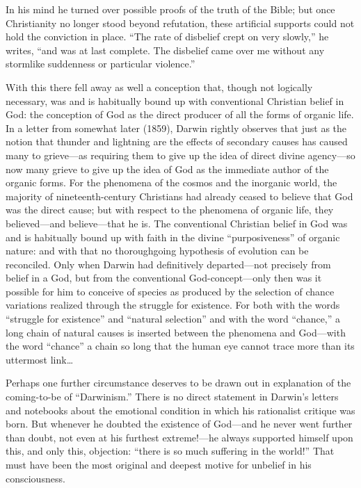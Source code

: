 \documentclass[12pt,a4paper]{article}
\begin{document}
In his mind he turned over possible proofs of the truth of the
Bible; but once Christianity no longer stood beyond refutation,
these artificial supports could not hold the conviction in
place. ``The rate of disbelief crept on very slowly,'' he
writes, ``and was at last complete. The disbelief came over me
without any stormlike suddenness or particular violence.''

With this there fell away as well a conception that, though
not logically necessary, was and is habitually bound up with
conventional Christian belief in God: the conception of God as
the direct producer of all the forms of organic life. In a
letter from somewhat later (1859), Darwin rightly observes
that just as the notion that thunder and lightning are the
effects of secondary causes has caused many to grieve---as
requiring them to give up the idea of direct divine
agency---so now many grieve to give up the idea of God as the
immediate author of the organic forms. For the phenomena of
the cosmos and the inorganic world, the majority of
nineteenth-century Christians had already ceased to believe that
God was the direct cause; but with respect to the phenomena of
organic life, they believed---and believe---that he is. The
conventional Christian belief in God was and is habitually bound
up with faith in the divine ``purposiveness'' of organic nature:
and with that no thoroughgoing hypothesis of evolution can be
reconciled. Only when Darwin had definitively departed---not
precisely from belief in a God, but from the conventional
God-concept---only then was it possible for him to conceive of
species as produced by the selection of chance variations
realized through the struggle for existence. For both with the
words ``struggle for existence'' and ``natural selection'' and
with the word ``chance,'' a long chain of natural causes is
inserted between the phenomena and God---with the word
``chance'' a chain so long that the human eye cannot trace more
than its uttermost link\ldots

Perhaps one further circumstance deserves to be drawn out in
explanation of the coming-to-be of ``Darwinism.'' There is no
direct statement in Darwin's letters and notebooks about the
emotional condition in which his rationalist critique was born.
But whenever he doubted the existence of God---and he never went
further than doubt, not even at his furthest extreme!---he
always supported himself upon this, and only this, objection:
``there is so much suffering in the world!'' That must have been
the most original and deepest motive for unbelief in his
consciousness.
\end{document}

